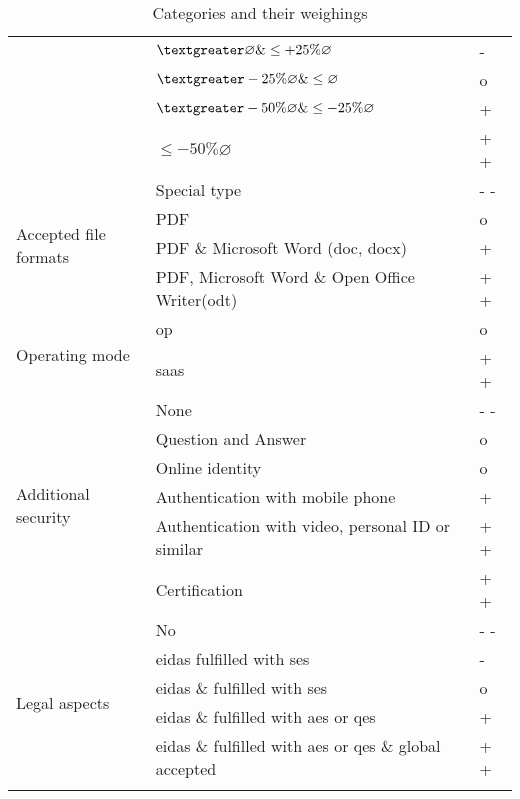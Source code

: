 \begin{longtable}{|p{4cm}|p{9cm}|p{1.5cm}|}
								& $ \textgreater \varnothing \& \leq +25\% \varnothing $ & - \\ \cline{2-3}
								& $ \textgreater -25\% \varnothing \& \leq \varnothing  $ & o \\ \cline{2-3}
								& $ \textgreater -50\% \varnothing \& \leq -25\% \varnothing $ & + \\ \cline{2-3}
								& $ \leq -50\% \varnothing $ & + + \\ \hline
		\multirow{4}{*}{Accepted file formats} & Special type & - - \\ \cline{2-3}
												& \Gls{PDF} & o \\ \cline{2-3}
												& \Gls{PDF} \& Microsoft Word (doc, docx) & + \\ \cline{2-3}
												& \Gls{PDF}, Microsoft Word \& Open Office Writer(odt) & + + \\ \hline
		\multirow{2}{*}{Operating mode} & \gls{op} & o \\ \cline{2-3}
										 & \gls{saas} & + + \\ \hline
		\multirow{6}{*}{Additional security} & None & - - \\ \cline{2-3}
											& Question and Answer & o \\ \cline{2-3} 
											& Online identity & o \\ \cline{2-3}
											& Authentication with mobile phone & + \\ \cline{2-3}
											& Authentication with video, personal ID or similar & + + \\ \cline{2-3}
											& Certification & + + \\ \hline
		\multirow{6}{*}{Legal aspects} & No & - - \\ \cline{2-3}
										& \gls{eidas} fulfilled with \gls{ses} & - \\ \cline{2-3}
										& \gls{eidas} \& \glossary{gdpr} fulfilled with \gls{ses} & o \\ \cline{2-3}
										& \gls{eidas} \& \glossary{gdpr} fulfilled with \gls{aes} or \gls{qes} & + \\ \cline{2-3}
										& \gls{eidas} \& \glossary{gdpr} fulfilled with \gls{aes} or \gls{qes} \& global accepted & + + \\ \hline
	\caption{Categories and their weighings}
	\label{tab:resTcateg}
	\end{longtable}
